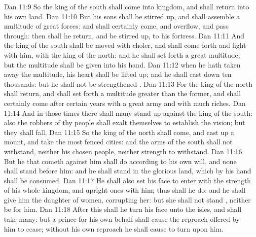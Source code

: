 \vs Dan 11:9 So the king of the south shall come into  kingdom, and shall return into his own land.
\vs Dan 11:10 But his sons shall be stirred up, and shall assemble a multitude of great forces: and  shall certainly come, and overflow, and pass through: then shall he return, and be stirred up,  to his fortress.
\vs Dan 11:11 And the king of the south shall be moved with choler, and shall come forth and fight with him,  with the king of the north: and he shall set forth a great multitude; but the multitude shall be given into his hand.
\vs Dan 11:12  when he hath taken away the multitude, his heart shall be lifted up; and he shall cast down  ten thousands: but he shall not be strengthened .
\vs Dan 11:13 For the king of the north shall return, and shall set forth a multitude greater than the former, and shall certainly come after certain years with a great army and with much riches.
\vs Dan 11:14 And in those times there shall many stand up against the king of the south: also the robbers of thy people shall exalt themselves to establish the vision; but they shall fall.
\vs Dan 11:15 So the king of the north shall come, and cast up a mount, and take the most fenced cities: and the arms of the south shall not withstand, neither his chosen people, neither  strength to withstand.
\vs Dan 11:16 But he that cometh against him shall do according to his own will, and none shall stand before him: and he shall stand in the glorious land, which by his hand shall be consumed.
\vs Dan 11:17 He shall also set his face to enter with the strength of his whole kingdom, and upright ones with him; thus shall he do: and he shall give him the daughter of women, corrupting her: but she shall not stand , neither be for him.
\vs Dan 11:18 After this shall he turn his face unto the isles, and shall take many: but a prince for his own behalf shall cause the reproach offered by him to cease; without his own reproach he shall cause  to turn upon him.
